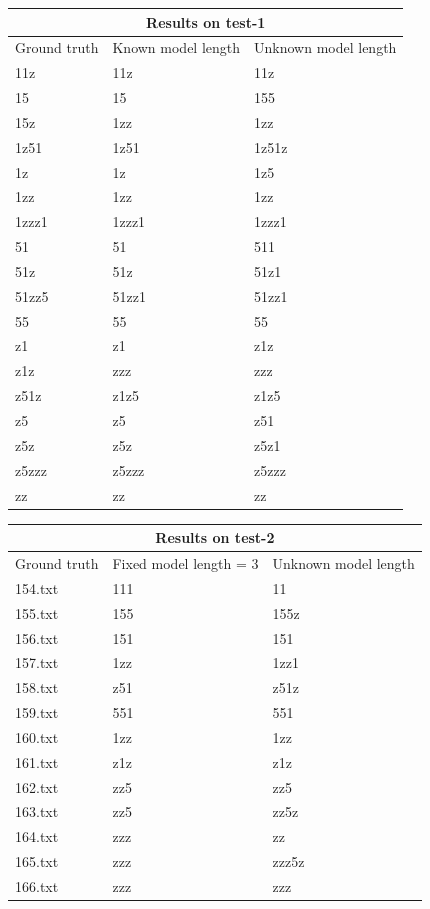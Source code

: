\documentclass{article}
\begin{document}
\begin{table}[h!]
\centering
\begin{tabular}{ |p{2.5cm}|p{2.5cm}|p{2.5cm}|  }
\hline
\multicolumn{3}{|c|}{Results on test-1} \\
\hline
Ground truth & Known model length & Unknown model length \\
\hline
11z & 11z & 11z\\
15 & 15 & 155\\
15z & 1zz & 1zz\\
1z51 & 1z51 & 1z51z\\
1z & 1z & 1z5\\
1zz & 1zz & 1zz\\
1zzz1 & 1zzz1 & 1zzz1\\
51 & 51 & 511\\
51z & 51z & 51z1\\
51zz5 & 51zz1 & 51zz1\\
55 & 55 & 55\\
z1 & z1 & z1z\\
z1z & zzz & zzz\\
z51z & z1z5 & z1z5\\
z5 & z5 & z51\\
z5z & z5z & z5z1\\
z5zzz & z5zzz & z5zzz\\
zz & zz & zz\\
\hline
\end{tabular}
\end{table}

\begin{table}[h!]
\centering
\begin{tabular}{ |p{2.5cm}|p{2.5cm}|p{2.5cm}|  }
\hline
\multicolumn{3}{|c|}{Results on test-2} \\
\hline
Ground truth & Fixed model length = 3 & Unknown model length \\
\hline
154.txt & 111 & 11\\
155.txt & 155 & 155z\\
156.txt & 151 & 151\\
157.txt & 1zz & 1zz1\\
158.txt & z51 & z51z\\
159.txt & 551 & 551\\
160.txt & 1zz & 1zz\\
161.txt & z1z & z1z\\
162.txt & zz5 & zz5\\
163.txt & zz5 & zz5z\\
164.txt & zzz & zz\\
165.txt & zzz & zzz5z\\
166.txt & zzz & zzz\\
\hline
\end{tabular}
\end{table}
\end{document}

